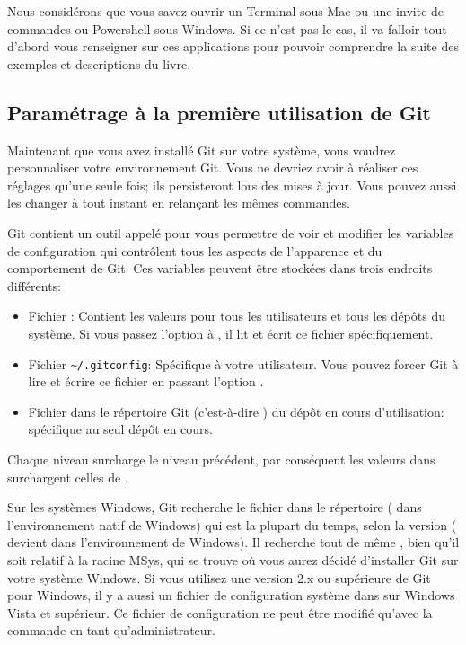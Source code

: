 Nous considérons que vous savez ouvrir un Terminal sous Mac ou une invite de commandes ou Powershell sous Windows.
Si ce n'est pas le cas, il va falloir tout d'abord vous renseigner sur ces applications pour pouvoir comprendre la suite des exemples et descriptions du livre.

\subsection{Paramétrage à la première utilisation de Git}
\label{sec:git:first_time}

Maintenant que vous avez installé Git sur votre système, vous voudrez personnaliser votre environnement Git.
Vous ne devriez avoir à réaliser ces réglages qu'une seule fois;
ils persisteront lors des mises à jour.
Vous pouvez aussi les changer à tout instant en relançant les mêmes commandes.

Git contient un outil appelé  pour vous permettre de voir et modifier les variables de configuration qui contrôlent tous les aspects de l'apparence et du comportement de Git.
Ces variables peuvent être stockées dans trois endroits différents:
\begin{itemize}
\item Fichier : Contient les valeurs pour tous les utilisateurs et tous les dépôts du système.
Si vous passez l'option  à , il lit et écrit ce fichier spécifiquement.
\item Fichier \verb=~/.gitconfig=: Spécifique à votre utilisateur.
Vous pouvez forcer Git à lire et écrire ce fichier en passant l'option .
\item Fichier  dans le répertoire Git (c'est-à-dire ) du dépôt en cours d'utilisation: spécifique au seul dépôt en cours.
\end{itemize}
Chaque niveau surcharge le niveau précédent, par conséquent les valeurs dans  surchargent celles de .

Sur les systèmes Windows, Git recherche le fichier  dans le répertoire  ( dans l’environnement natif de Windows) qui est  la plupart du temps, selon la version ( devient  dans l’environnement de Windows).
Il recherche tout de même , bien qu'il soit relatif à la racine MSys, qui se trouve où vous aurez décidé d'installer Git sur votre système Windows.
Si vous utilisez une version 2.x ou supérieure de Git pour Windows, il y a aussi un fichier de configuration système dans  sur Windows Vista et supérieur.
Ce fichier de configuration ne peut être modifié qu'avec la commande  en tant qu'administrateur.

